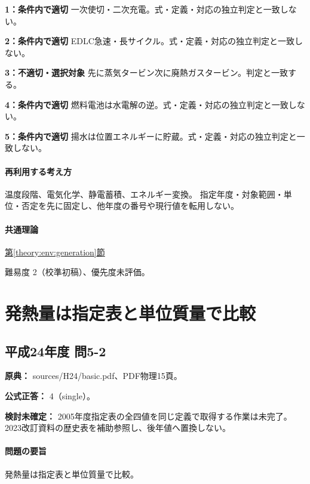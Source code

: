\noindent\textbf{1：条件内で適切} 一次使切・二次充電。式・定義・対応の独立判定と一致しない。\par

\noindent\textbf{2：条件内で適切} EDLC急速・長サイクル。式・定義・対応の独立判定と一致しない。\par

\noindent\textbf{3：不適切・選択対象} 先に蒸気タービン次に廃熱ガスタービン。判定と一致する。\par

\noindent\textbf{4：条件内で適切} 燃料電池は水電解の逆。式・定義・対応の独立判定と一致しない。\par

\noindent\textbf{5：条件内で適切} 揚水は位置エネルギーに貯蔵。式・定義・対応の独立判定と一致しない。\par

\paragraph{再利用する考え方} 温度段階、電気化学、静電蓄積、エネルギー変換。 指定年度・対象範囲・単位・否定を先に固定し、他年度の番号や現行値を転用しない。

\paragraph{共通理論} \hyperref[theory:env:generation]{第\ref*{theory:env:generation}節}

\par 難易度 2（校準初稿）、優先度未評価。

\section{発熱量は指定表と単位質量で比較}

\subsection{平成24年度 問5-2}
\label{q:h24-reg-basic-5-2}

\noindent\textbf{原典：} sources/H24/basic.pdf、PDF物理15頁。

\textbf{公式正答：} 4（single）。

\par\textbf{検討未確定：} 2005年度指定表の全四値を同じ定義で取得する作業は未完了。2023改訂資料の歴史表を補助参照し、後年値へ置換しない。

\paragraph{問題の要旨} 発熱量は指定表と単位質量で比較。

